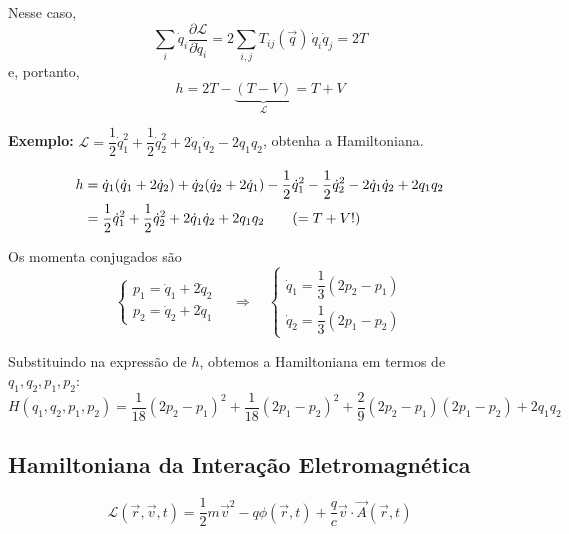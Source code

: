 Nesse caso,
\begin{equation}
    \sum_i \dot{q}_i \frac{\partial \mathcal{L}}{\partial \dot{q}_i} = 2 \sum_{i,j} T_{ij}(\vec{q}) \, \dot{q}_i \dot{q}_j = 2T
\label{eq:aula9_2T}
\end{equation}
e, portanto,
\begin{equation}
    h = 2T - \underbrace{(T - V)}_{\mathcal{L}} = T + V
\label{eq:aula9_h_TV}
\end{equation}

\textbf{Exemplo:} $\mathcal{L} = \dfrac{1}{2}\dot{q}_1^2 + \dfrac{1}{2}\dot{q}_2^2 + 2\dot{q}_1 \dot{q}_2 - 2q_1 q_2$, obtenha a Hamiltoniana.

\begin{align}
    h &= \dot{q}_1(\dot{q}_1 + 2\dot{q}_2) + \dot{q}_2(\dot{q}_2 + 2\dot{q}_1) - \frac{1}{2}\dot{q}_1^2 - \frac{1}{2}\dot{q}_2^2 - 2\dot{q}_1 \dot{q}_2 + 2 q_1 q_2 \notag \\
    &= \frac{1}{2}\dot{q}_1^2 + \frac{1}{2}\dot{q}_2^2 + 2\dot{q}_1\dot{q}_2 + 2q_1 q_2 \qquad (= T + V !)
\label{eq:aula9_exemplo_h}
\end{align}

Os momenta conjugados são
\begin{equation}
    \begin{cases}
        p_1 = \dot{q}_1 + 2\dot{q}_2 \\
        p_2 = \dot{q}_2 + 2\dot{q}_1
    \end{cases}
    \quad \Longrightarrow \quad
    \begin{cases}
        \dot{q}_1 = \dfrac{1}{3}(2p_2 - p_1) \\[2mm]
        \dot{q}_2 = \dfrac{1}{3}(2p_1 - p_2)
    \end{cases}
\label{eq:aula9_momentos_exemplo}
\end{equation}

Substituindo na expressão de $h$, obtemos a Hamiltoniana em termos de $q_1, q_2, p_1, p_2$:
\begin{equation}
    H(q_1, q_2, p_1, p_2) = \frac{1}{18}(2p_2 - p_1)^2 + \frac{1}{18}(2p_1 - p_2)^2 + \frac{2}{9}(2p_2 - p_1)(2p_1 - p_2) + 2 q_1 q_2
\label{eq:aula9_H_exemplo_final}
\end{equation}

\subsection*{Hamiltoniana da Interação Eletromagnética}

\begin{equation}
    \mathcal{L}(\vec{r}, \vec{v}, t) = \frac{1}{2}m\vec{v}^2 - q\phi(\vec{r}, t) + \frac{q}{c}\vec{v}\cdot\vec{A}(\vec{r}, t)
\label{eq:aula9_lagrangiana_em}
\end{equation}


